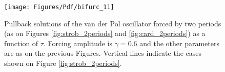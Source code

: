 \begin{figure}
\texttt{[image: Figures/Pdf/bifurc\_11]}
\caption
{
Pullback solutions of the van der Pol oscillator forced by two periods (as on Figures \ref{fig:strob_2periods} and \ref{fig:card_2periods}) as a function of $\tau$. Forcing amplitude is $\gamma=0.6$ and  the other parameters are as on the previous Figures. Vertical lines indicate the cases shown on Figure \ref{fig:strob_2periods}.
}
\label{fig:bifurc_11}
\end{figure}
